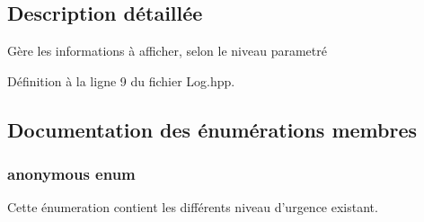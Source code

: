 \subsection{Description détaillée}
Gère les informations à afficher, selon le niveau parametré 

Définition à la ligne 9 du fichier Log.\+hpp.



\subsection{Documentation des énumérations membres}
\hypertarget{structLogger_a737161d132f5296b6a6a387e702343ac}{\subsubsection[{anonymous enum}]{\setlength{\rightskip}{0pt plus 5cm}anonymous enum}}\label{structLogger_a737161d132f5296b6a6a387e702343ac}


Cette énumeration contient les différents niveau d'urgence existant. 

